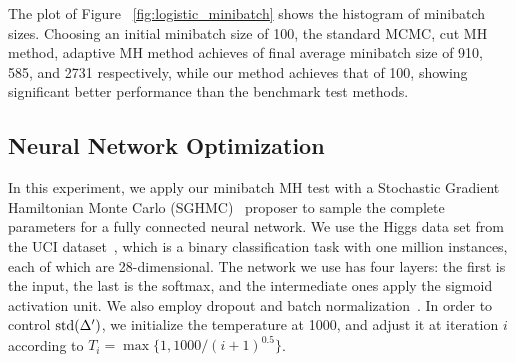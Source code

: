 \documentclass{article}
\begin{document}

The plot of Figure ~\ref{fig:logistic_minibatch} shows the histogram of minibatch sizes. Choosing an initial minibatch size of 100, 
the standard MCMC, cut MH method, adaptive MH method achieves of final average minibatch size of 910, 585, and 2731 respectively, while our method achieves 
that of 100, showing significant better performance than the benchmark test methods.  



\iffalse
\subsection{Neural Network Optimization}\label{ssec:nets}

In this experiment, we apply our minibatch MH test with a Stochastic Gradient Hamiltonian
Monte Carlo (SGHMC)~\cite{sghmc_2014} proposer to sample the complete parameters for a fully
connected neural network. We use the Higgs data set from the UCI dataset~\cite{Lichman:2013}, which
is a binary classification task with one million instances, each of which are 28-dimensional. The
network we use has four layers: the first is the input, the last is the softmax, and the
intermediate ones apply the sigmoid activation unit.  We also employ dropout and batch
normalization~\cite{icml2015_ioffe15}.  In order to control ${\rm std}(\Delta')$, we initialize the
temperature at 1000, and adjust it at iteration $i$ according to $T_i = \max\{1,
1000/(i+1)^{0.5}\}$.
\end{document}
